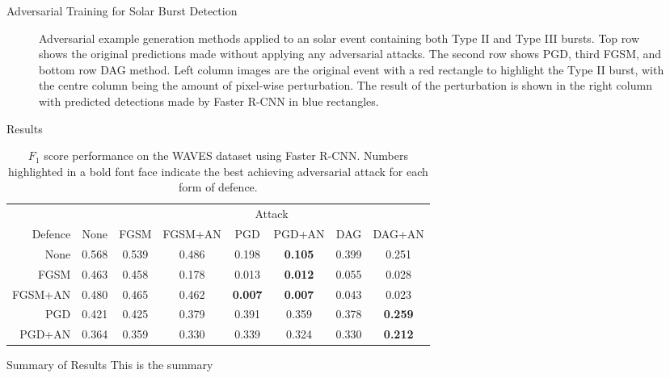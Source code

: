 \documentclass[smaller]{beamer}
\begin{document}
\begin{frame}[label={sec:org8cb346d}]{Adversarial Training for Solar Burst Detection}
\begin{figure}[t]
\centering
\resizebox{0.8\textwidth}{!}{}
\caption{Adversarial example generation methods applied to an solar event containing both Type II and Type III bursts. Top row shows the original predictions made without applying any adversarial attacks. The second row shows PGD, third FGSM, and bottom row DAG method. Left column images are the original event with a red rectangle to highlight the Type II burst, with the centre column being the amount of pixel-wise perturbation. The result of the perturbation is shown in the right column with predicted detections made by Faster R-CNN in blue rectangles.}
\label{fig:adv_example}
\end{figure}
\end{frame}
\begin{frame}[label={sec:org8bcda53}]{Results}
\begin{table}
\caption{\label{tab:adv_fscore}$F_1$ score performance on the WAVES dataset using Faster R-CNN. Numbers highlighted in a bold font face indicate the best achieving adversarial attack for each form of defence.}
\centering
\begin{adjustbox}{center}
\begin{tabular}[t]{rccccccc}
\toprule
\multicolumn{2}{c}{ } & \multicolumn{6}{c}{Attack} \\
\cmidrule(l{3pt}r{3pt}){3-8}
Defence & None & FGSM & FGSM+AN & PGD & PGD+AN & DAG & DAG+AN\\
\midrule
None & 0.568 & 0.539 & 0.486 & 0.198 & \textbf{0.105} & 0.399 & 0.251\\
FGSM & 0.463 & 0.458 & 0.178 & 0.013 & \textbf{0.012} & 0.055 & 0.028\\
FGSM+AN & 0.480 & 0.465 & 0.462 & \textbf{0.007} & \textbf{0.007} & 0.043 & 0.023\\
PGD & 0.421 & 0.425 & 0.379 & 0.391 & 0.359 & 0.378 & \textbf{0.259}\\
PGD+AN & 0.364 & 0.359 & 0.330 & 0.339 & 0.324 & 0.330 & \textbf{0.212}\\
\bottomrule
\end{tabular}
\end{adjustbox}
\end{table}
\end{frame}

\begin{frame}[label={sec:org10fb28e}]{Summary of Results}
This is the summary
\end{frame}
\end{document}
